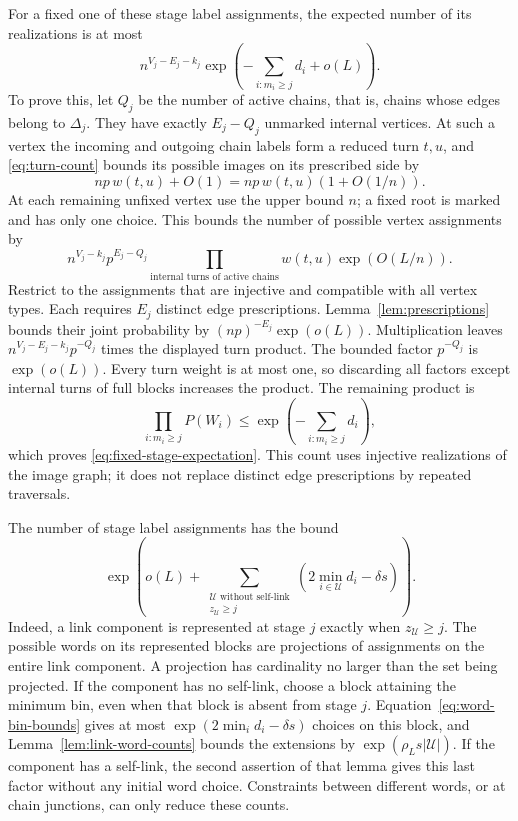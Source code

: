 For a fixed one of these stage label assignments, the expected number
of its realizations is at most
\begin{equation}\label{eq:fixed-stage-expectation}
 n^{V_j-E_j-k_j}
 \exp\left(-\sum_{i:m_i\geq j}d_i+o(L)\right).
\end{equation}
To prove this, let $Q_j$ be the number of active chains, that is,
chains whose edges belong to $\Delta_j$.  They have exactly
$E_j-Q_j$ unmarked internal vertices.  At such a vertex the incoming
and outgoing chain labels form a reduced turn $t,u$, and
\eqref{eq:turn-count} bounds its possible images on its prescribed side
by
\[
 np\,w(t,u)+O(1)=np\,w(t,u)(1+O(1/n)).
\]
At each remaining unfixed vertex use the upper bound $n$; a fixed root
is marked and has only one choice.  This bounds the number of possible
vertex assignments by
\[
 n^{V_j-k_j}p^{E_j-Q_j}
 \prod_{\text{internal turns of active chains}}w(t,u)
 \exp(O(L/n)).
\]
Restrict to the assignments that are injective and compatible with all
vertex types.  Each requires $E_j$ distinct edge prescriptions.
Lemma~\ref{lem:prescriptions} bounds their joint probability by
$(np)^{-E_j}\exp(o(L))$.  Multiplication leaves
$n^{V_j-E_j-k_j}p^{-Q_j}$ times the displayed turn product.
The bounded factor $p^{-Q_j}$ is $\exp(o(L))$.  Every turn weight is
at most one, so discarding all factors except internal turns of full
blocks increases the product.  The remaining product is
\[
 \prod_{i:m_i\geq j}P(W_i)
 \leq\exp\left(-\sum_{i:m_i\geq j}d_i\right),
\]
which proves \eqref{eq:fixed-stage-expectation}.  This count uses
injective realizations of the image graph; it does not replace distinct
edge prescriptions by repeated traversals.

The number of stage label assignments has the bound
\begin{equation}\label{eq:stage-label-count}
 \exp\left(o(L)+
 \sum_{\substack{\mathcal U\text{ without self-link}\\
                  z_{\mathcal U}\geq j}}
 \left(2\min_{i\in\mathcal U}d_i-\delta s\right)\right).
\end{equation}
Indeed, a link component is represented at stage $j$ exactly when
$z_{\mathcal U}\geq j$.  The possible words on its represented blocks
are projections of assignments on the entire link component.  A
projection has cardinality no larger than the set being projected.
If the component has no self-link, choose a block attaining the
minimum bin, even when that block is absent from stage $j$.
Equation~\eqref{eq:word-bin-bounds} gives at most
$\exp(2\min_i d_i-\delta s)$ choices on this block, and
Lemma~\ref{lem:link-word-counts} bounds the extensions by
$\exp(\rho_Ls|\mathcal U|)$.  If the component has a self-link,
the second assertion of that lemma gives this last factor without
any initial word choice.  Constraints between different words, or at
chain junctions, can only reduce these counts.

